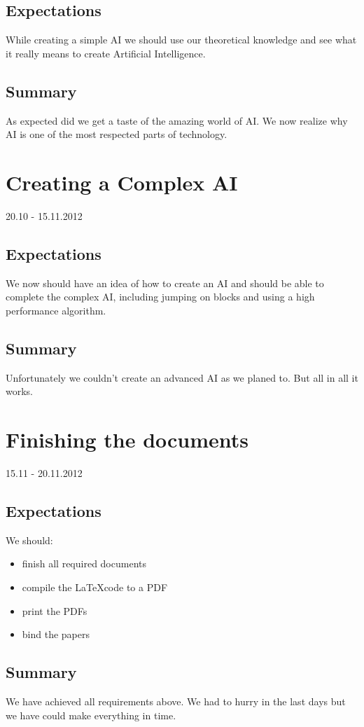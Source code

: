\subsection*{Expectations}
While creating a simple AI we should use our theoretical knowledge and see what it really means to create Artificial Intelligence.
\subsection*{Summary}
As expected did we get a taste of the amazing world of AI. We now realize why AI is one of the most respected parts of technology.

\section{Creating a Complex AI}
20.10 - 15.11.2012
\subsection*{Expectations}
We now should have an idea of how to create an AI and should be able to complete the complex AI, including jumping on blocks and using a high performance algorithm.
\subsection*{Summary}
Unfortunately we couldn't create an advanced AI as we planed to. But all in all it works.

\section{Finishing the documents}
15.11 - 20.11.2012
\subsection*{Expectations}
We should:
\begin{itemize}
  \item finish all required documents
  \item compile the \LaTeX code to a PDF
  \item print the PDFs
  \item bind the papers
\end{itemize}
\subsection*{Summary}
We have achieved all requirements above. We had to hurry in the last days but we have could make everything in time.


